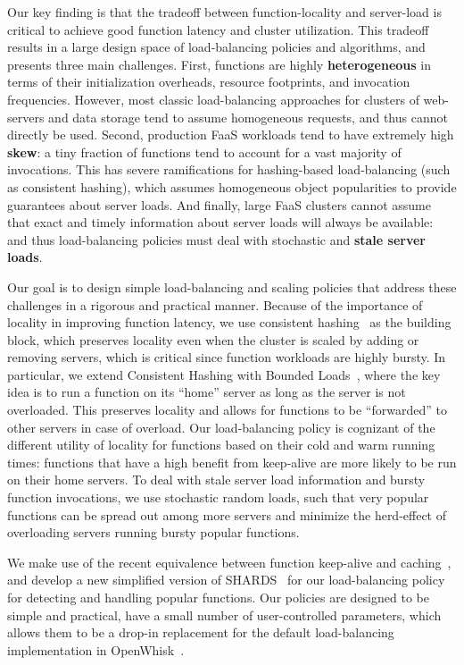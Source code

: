 Our key finding is that the tradeoff between function-locality and server-load is critical to achieve good function latency and cluster utilization.
This tradeoff results in a large design space of load-balancing policies and algorithms, and presents three main challenges.
First, functions are highly \textbf{heterogeneous} in terms of their initialization overheads, resource footprints, and invocation frequencies. 
However, most classic load-balancing approaches for clusters of web-servers and data storage tend to assume homogeneous requests, and thus cannot directly be used.
Second, production FaaS workloads tend to have extremely high \textbf{skew}: a tiny fraction of functions tend to account for a vast majority of invocations.
This has severe ramifications for hashing-based load-balancing (such as consistent hashing), which assumes homogeneous object popularities to provide guarantees about server loads.
And finally, large FaaS clusters cannot assume that exact and timely information about server loads will always be available: and thus load-balancing policies must deal with stochastic and \textbf{stale server loads}.

Our goal is to design simple load-balancing and scaling policies that address these challenges in a rigorous and practical manner.
Because of the importance of locality in improving function latency, we use consistent hashing~\cite{karger1997consistent} as the building block, which preserves locality even when the cluster is scaled by adding or removing servers, which is critical since function workloads are highly bursty. 
In particular, we extend Consistent Hashing with Bounded Loads~\cite{mirrokni2018consistent}, where the key idea is to run a function on its ``home'' server as long as the server is not overloaded.
This preserves locality and allows for functions to be ``forwarded'' to other servers in case of overload.
Our load-balancing policy is cognizant of the different utility of locality for functions based on their cold and warm running times: functions that have a high benefit from keep-alive are more likely to be run on their home servers. 
To deal with stale server load information and bursty function invocations, we use stochastic random loads, such that very popular functions can be spread out among more servers and minimize the herd-effect of overloading servers running bursty popular functions. %

We make use of the recent equivalence between function keep-alive and caching~\cite{faascache-asplos21}, and develop a new simplified version of SHARDS~\cite{shards} for our load-balancing policy for detecting and handling popular functions. 
Our policies are designed to be simple and practical, have a small number of user-controlled parameters, which allows them to be a drop-in replacement for the default load-balancing implementation in OpenWhisk~\cite{openwhisk}. 

